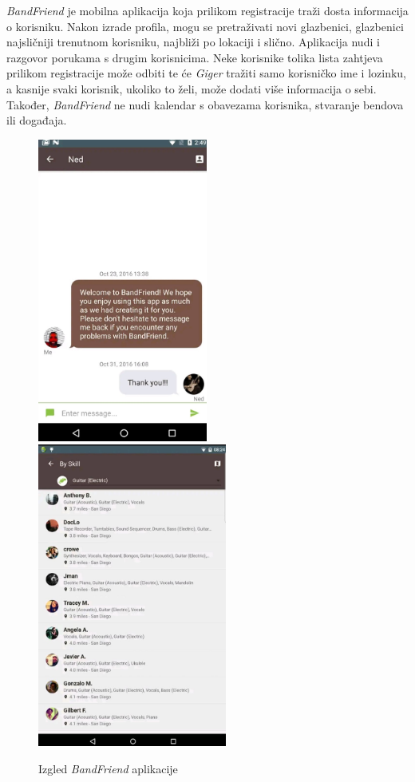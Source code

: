 		\textit{BandFriend} je mobilna aplikacija koja prilikom registracije traži dosta informacija o korisniku. Nakon izrade profila, mogu se pretraživati novi glazbenici, glazbenici najsličniji trenutnom korisniku, najbliži po lokaciji i slično. Aplikacija nudi i razgovor porukama s drugim korisnicima. Neke korisnike tolika lista zahtjeva prilikom registracije može odbiti te će \textit{Giger} tražiti samo korisničko ime i lozinku, a kasnije svaki korisnik, ukoliko to želi, može dodati više informacija o sebi. Također, \textit{BandFriend} ne nudi kalendar s obavezama korisnika, stvaranje bendova ili događaja.
		\\
		
		\begin{figure}[H]
			\begin{center}
				\includegraphics[height=10cm]{slike/BandFriend.JPEG}
				\includegraphics[height=10cm]{slike/BandFriend2.JPEG}
			\end{center}
			\caption{Izgled \textit{BandFriend} aplikacije}
			\label{fig:promjene2}
		\end{figure}
		 
